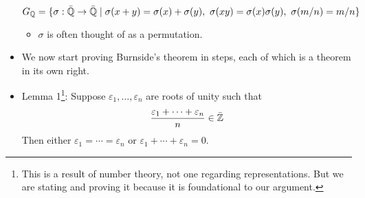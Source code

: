 \documentclass[../notes.tex]{subfiles}
\begin{document}
\begin{itemize}
\begin{equation*}
        G_\Q = \{\sigma:\bar{\Q}\to\bar{\Q}\mid\sigma(x+y)=\sigma(x)+\sigma(y),\ \sigma(xy)=\sigma(x)\sigma(y),\ \sigma(m/n)=m/n\}
    \end{equation*}
    \begin{itemize}
        \item $\sigma$ is often thought of as a permutation.
    \end{itemize}
    \item We now start proving Burnside's theorem in steps, each of which is a theorem in its own right.
    \item Lemma 1\footnote{This is a result of number theory, not one regarding representations. But we are stating and proving it because it is foundational to our argument.}: Suppose $\varepsilon_1,\dots,\varepsilon_n$ are roots of unity such that
    \begin{equation*}
        \frac{\varepsilon_1+\cdots+\varepsilon_n}{n} \in \bar{\mathbb{Z}}
    \end{equation*}
    Then either $\varepsilon_1=\cdots=\varepsilon_n$ or $\varepsilon_1+\cdots+\varepsilon_n=0$.
    
    
    
    
    
    

\end{itemize}
\end{document}
